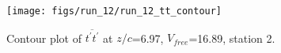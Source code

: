 \begin{figure}[H]
\centering
\texttt{[image: figs/run\_12/run\_12\_tt\_contour]}
\caption{Contour plot of $\overline{t^\prime t^\prime}$ at $z/c$=6.97, $V_{free}$=16.89, station 2.}
\label{fig:run_12_tt_contour}
\end{figure}


